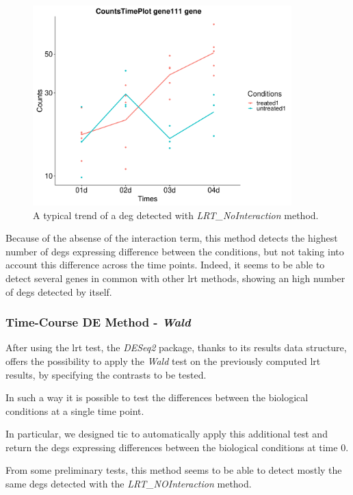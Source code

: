 \begin{figure}[H]
\centering
\includegraphics[width=10cm, keepaspectratio]{img/ticorser/de/trends/trend_noint.pdf}
\caption[\gls{tic} LRT\_NOInteraction trend]{A typical trend of a \gls{deg} detected with \textit{LRT\_NoInteraction} method.}
\label{fig:ticlrtnoint}
\end{figure}

Because of the absense of the interaction term, this method detects the highest number of \glspl{deg} expressing difference between the conditions, but not taking into account this difference across the time points.
Indeed, it seems to be able to detect several genes in common with other \gls{lrt} methods, showing an high number of \glspl{deg} detected by itself.

\subsubsection{Time-Course DE Method - \textit{Wald}}

After using the \gls{lrt} test, the \textit{DESeq2} package, thanks to its results data structure, offers the possibility to apply the \textit{Wald} test on the previously computed \gls{lrt} results, by specifying the contrasts to be tested.

In such a way it is possible to test the differences between the biological conditions at a single time point.

In particular, we designed \gls{tic} to automatically apply this additional test and return the \glspl{deg} expressing differences between the biological conditions at time 0.

From some preliminary tests, this method seems to be able to detect mostly the same \glspl{deg} detected with the \textit{LRT\_NOInteraction} method.

